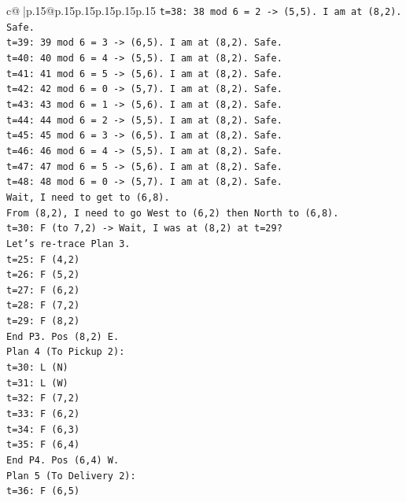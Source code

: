 \documentclass{article}
\begin{document}
{\begin{supertabular}{c@{$\;$}|p{.15\linewidth}@{}p{.15\linewidth}p{.15\linewidth}p{.15\linewidth}p{.15\linewidth}p{.15\linewidth}}
{{{\texttt{t=38: 38 mod 6 = 2 {-}> (5,5). I am at (8,2). Safe.} \\
\texttt{t=39: 39 mod 6 = 3 {-}> (6,5). I am at (8,2). Safe.} \\
\texttt{t=40: 40 mod 6 = 4 {-}> (5,5). I am at (8,2). Safe.} \\
\texttt{t=41: 41 mod 6 = 5 {-}> (5,6). I am at (8,2). Safe.} \\
\texttt{t=42: 42 mod 6 = 0 {-}> (5,7). I am at (8,2). Safe.} \\
\texttt{t=43: 43 mod 6 = 1 {-}> (5,6). I am at (8,2). Safe.} \\
\texttt{t=44: 44 mod 6 = 2 {-}> (5,5). I am at (8,2). Safe.} \\
\texttt{t=45: 45 mod 6 = 3 {-}> (6,5). I am at (8,2). Safe.} \\
\texttt{t=46: 46 mod 6 = 4 {-}> (5,5). I am at (8,2). Safe.} \\
\texttt{t=47: 47 mod 6 = 5 {-}> (5,6). I am at (8,2). Safe.} \\
\texttt{t=48: 48 mod 6 = 0 {-}> (5,7). I am at (8,2). Safe.} \\
\texttt{Wait, I need to get to (6,8).} \\
\texttt{From (8,2), I need to go West to (6,2) then North to (6,8).} \\
\texttt{t=30: F (to 7,2) {-}> Wait, I was at (8,2) at t=29?} \\
\texttt{Let's re{-}trace Plan 3.} \\
\texttt{t=25: F (4,2)} \\
\texttt{t=26: F (5,2)} \\
\texttt{t=27: F (6,2)} \\
\texttt{t=28: F (7,2)} \\
\texttt{t=29: F (8,2)} \\
\texttt{End P3. Pos (8,2) E.} \\
\texttt{Plan 4 (To Pickup 2):} \\
\texttt{t=30: L (N)} \\
\texttt{t=31: L (W)} \\
\texttt{t=32: F (7,2)} \\
\texttt{t=33: F (6,2)} \\
\texttt{t=34: F (6,3)} \\
\texttt{t=35: F (6,4)} \\
\texttt{End P4. Pos (6,4) W.} \\
\texttt{Plan 5 (To Delivery 2):} \\
\texttt{t=36: F (6,5)} \\
}}}
\end{supertabular}}
\end{document}
